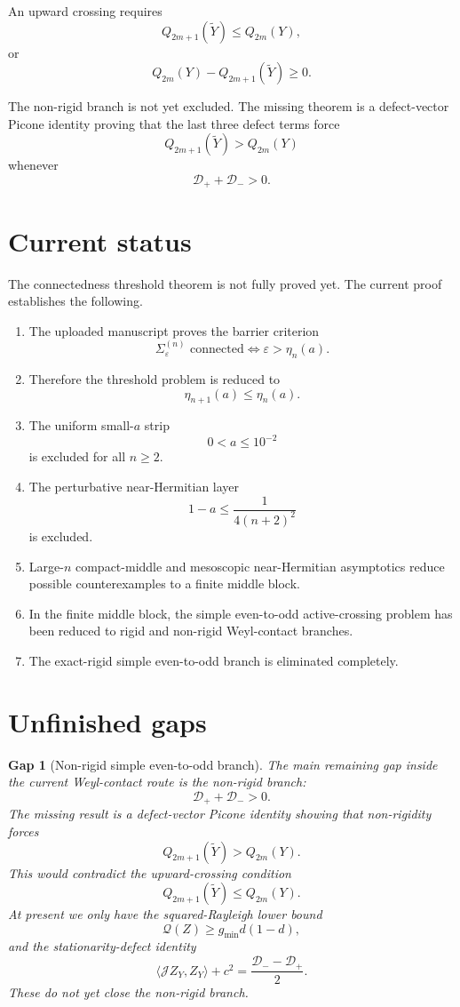 \documentclass[11pt]{article}
\numberwithin{equation}{section}
\newtheorem{gap}[theorem]{Gap}
\begin{document}
An upward crossing requires
\[
Q_{2m+1}(\widetilde Y)\le Q_{2m}(Y),
\]
or
\[
Q_{2m}(Y)-Q_{2m+1}(\widetilde Y)\ge0.
\]

The non-rigid branch is not yet excluded. The missing theorem is a defect-vector
Picone identity proving that the last three defect terms force
\[
Q_{2m+1}(\widetilde Y)>Q_{2m}(Y)
\]
whenever
\[
\mathcal D_++\mathcal D_->0.
\]

\section{Current status}

The connectedness threshold theorem is not fully proved yet. The current proof
establishes the following.

\begin{enumerate}[label=\textup{(\arabic*)}]
\item The uploaded manuscript proves the barrier criterion
\[
\Sigma_\varepsilon^{(n)}\text{ connected}
\iff
\varepsilon>\eta_n(a).
\]

\item Therefore the threshold problem is reduced to
\[
\eta_{n+1}(a)\le\eta_n(a).
\]

\item The uniform small-\(a\) strip
\[
0<a\le10^{-2}
\]
is excluded for all \(n\ge2\).

\item The perturbative near-Hermitian layer
\[
1-a\le \frac{1}{4(n+2)^2}
\]
is excluded.

\item Large-\(n\) compact-middle and mesoscopic near-Hermitian asymptotics reduce
possible counterexamples to a finite middle block.

\item In the finite middle block, the simple even-to-odd active-crossing problem has
been reduced to rigid and non-rigid Weyl-contact branches.

\item The exact-rigid simple even-to-odd branch is eliminated completely.
\end{enumerate}

\section{Unfinished gaps}

\begin{gap}[Non-rigid simple even-to-odd branch]
The main remaining gap inside the current Weyl-contact route is the non-rigid branch:
\[
\mathcal D_++\mathcal D_->0.
\]
The missing result is a defect-vector Picone identity showing that non-rigidity forces
\[
Q_{2m+1}(\widetilde Y)>Q_{2m}(Y).
\]
This would contradict the upward-crossing condition
\[
Q_{2m+1}(\widetilde Y)\le Q_{2m}(Y).
\]
At present we only have the squared-Rayleigh lower bound
\[
\mathcal Q(Z)\ge g_{\min}d(1-d),
\]
and the stationarity-defect identity
\[
\langle \mathcal JZ_Y,Z_Y\rangle+c^2
=
\frac{\mathcal D_--\mathcal D_+}{2}.
\]
These do not yet close the non-rigid branch.
\end{gap}
\end{document}
